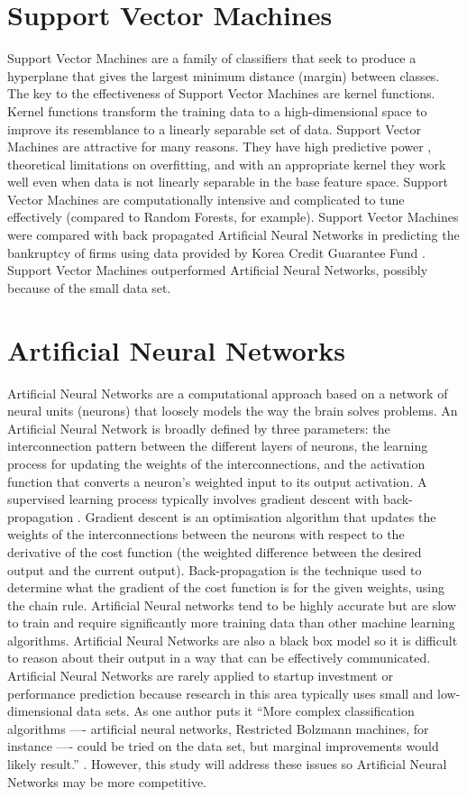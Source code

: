 \section{Support Vector Machines}

Support Vector Machines are a family of classifiers that seek to produce a hyperplane that gives the largest minimum distance (margin) between classes. The key to the effectiveness of Support Vector Machines are kernel functions. Kernel functions transform the training data to a high-dimensional space to improve its resemblance to a linearly separable set of data. Support Vector Machines are attractive for many reasons. They have high predictive power \cite{caruana2006}, theoretical limitations on overfitting, and with an appropriate kernel they work well even when data is not linearly separable in the base feature space. Support Vector Machines are computationally intensive and complicated to tune effectively (compared to Random Forests, for example). Support Vector Machines were compared with back propagated Artificial Neural Networks in predicting the bankruptcy of firms using data provided by Korea Credit Guarantee Fund \cite{shin2005}. Support Vector Machines outperformed Artificial Neural Networks, possibly because of the small data set.

\section{Artificial Neural Networks}

Artificial Neural Networks are a computational approach based on a network of neural units (neurons) that loosely models the way the brain solves problems. An Artificial Neural Network is broadly defined by three parameters: the interconnection pattern between the different layers of neurons, the learning process for updating the weights of the interconnections, and the activation function that converts a neuron's weighted input to its output activation. A supervised learning process typically involves gradient descent with back-propagation \cite{rumelhart1988}. Gradient descent is an optimisation algorithm that updates the weights of the interconnections between the neurons with respect to the derivative of the cost function (the weighted difference between the desired output and the current output). Back-propagation is the technique used to determine what the gradient of the cost function is for the given weights, using the chain rule. Artificial Neural networks tend to be highly accurate but are slow to train and require significantly more training data than other machine learning algorithms. Artificial Neural Networks are also a black box model so it is difficult to reason about their output in a way that can be effectively communicated. Artificial Neural Networks are rarely applied to startup investment or performance prediction because research in this area typically uses small and low-dimensional data sets. As one author puts it ``More complex classification algorithms —- artificial neural networks, Restricted Bolzmann machines, for instance —- could be tried on the data set, but marginal improvements would likely result.'' \cite{beckwith2016}. However, this study will address these issues so Artificial Neural Networks may be more competitive.
